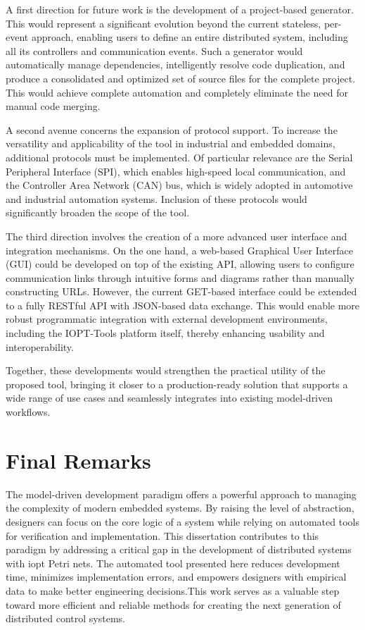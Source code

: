 A first direction for future work is the development of a project-based generator. This would represent a significant evolution beyond the current stateless, per-event approach, enabling users to define an entire distributed system, including all its controllers and communication events. Such a generator would automatically manage dependencies, intelligently resolve code duplication, and produce a consolidated and optimized set of source files for the complete project. This would achieve complete automation and completely eliminate the need for manual code merging.

A second avenue concerns the expansion of protocol support. To increase the versatility and applicability of the tool in industrial and embedded domains, additional protocols must be implemented. Of particular relevance are the Serial Peripheral Interface (SPI), which enables high-speed local communication, and the Controller Area Network (CAN) bus, which is widely adopted in automotive and industrial automation systems. Inclusion of these protocols would significantly broaden the scope of the tool.

The third direction involves the creation of a more advanced user interface and integration mechanisms. On the one hand, a web-based Graphical User Interface (GUI) could be developed on top of the existing API, allowing users to configure communication links through intuitive forms and diagrams rather than manually constructing URLs. However, the current GET-based interface could be extended to a fully RESTful API with JSON-based data exchange. This would enable more robust programmatic integration with external development environments, including the IOPT-Tools platform itself, thereby enhancing usability and interoperability.

Together, these developments would strengthen the practical utility of the proposed tool, bringing it closer to a production-ready solution that supports a wide range of use cases and seamlessly integrates into existing model-driven workflows.

\section{Final Remarks}
\label{sec:final_remarks}

The model-driven development paradigm offers a powerful approach to managing the complexity of modern embedded systems. By raising the level of abstraction, designers can focus on the core logic of a system while relying on automated tools for verification and implementation. This dissertation contributes to this paradigm by addressing a critical gap in the development of distributed systems with \gls{iopt} Petri nets. The automated tool presented here reduces development time, minimizes implementation errors, and empowers designers with empirical data to make better engineering decisions.This work serves as a valuable step toward more efficient and reliable methods for creating the next generation of distributed control systems.

